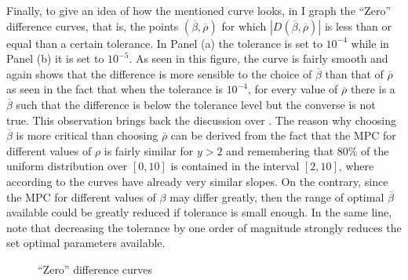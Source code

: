 \documentclass[english, a4paper,12pt]{article}
\begin{document}
Finally, to give an idea of how the mentioned curve looks, in  I graph the ``Zero'' difference curves, that is, the points $(\overline{\beta}, \overline{\rho})$ for which $|D(\overline{\beta}, \overline{\rho})|$ is less than or equal than a certain tolerance. In Panel (a) the tolerance is set to $10^{-4}$ while in Panel (b) it is set to $10^{-5}$. As seen in this figure, the curve is fairly smooth and again shows that the difference is more sensible to the choice of $\overline{\beta}$ than that of $\overline{\rho}$ as seen in the fact that when the tolerance is $10^{-4}$, for every value of $\overline{\rho}$ there is a $\overline{\beta}$ such that the difference is below the tolerance level but the converse is not true. This observation brings back the discussion over . The reason why choosing $\overline{\beta}$ is more critical than choosing $\overline{\rho}$ can be derived from the fact that the MPC for different values of $\rho$ is fairly similar for $y > 2$ and remembering that 80\% of the uniform distribution over $[0,10]$ is contained in the interval $[2,10]$, where according to  the curves have already very similar slopes. On the contrary, since the MPC for different values of $\beta$ may differ greatly, then the range of optimal $\overline{\beta}$ available could be greatly reduced if tolerance is small enough. In the same line, note that decreasing the tolerance by one order of magnitude strongly reduces the set optimal parameters available.
	\begin{figure}[H]
		\caption{``Zero'' difference curves}
		\label{fig:ZeroCurve}
		
		 \vspace{-2ex}

	\end{figure}
\end{document}
